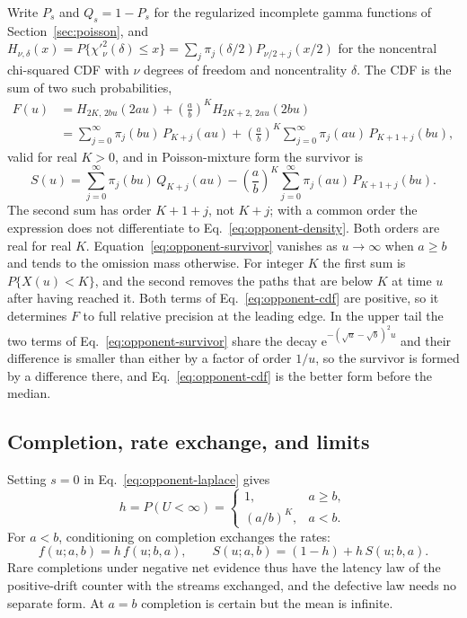 \documentclass[12pt]{article}
\newcommand{\e}{\mathrm{e}}
\theoremstyle{definition}
\theoremstyle{plain}
\theoremstyle{remark}
\begin{document}
Write $P_s$ and $Q_s=1-P_s$ for the regularized incomplete gamma functions of Section~\ref{sec:poisson}, and $H_{\nu,\delta}(x)=P\{\chi'^2_\nu(\delta)\leq x\}=\sum_j\pi_j(\delta/2)P_{\nu/2+j}(x/2)$ for the noncentral chi-squared CDF with $\nu$ degrees of freedom and noncentrality $\delta$. The CDF is the sum of two such probabilities,
\begin{equation}
\begin{split}
 F(u)&=H_{2K,\,2bu}(2au)+\left(\frac ab\right)^KH_{2K+2,\,2au}(2bu)\\
 &=\sum_{j=0}^\infty\pi_j(bu)\,P_{K+j}(au)
 +\left(\frac ab\right)^K\sum_{j=0}^\infty\pi_j(au)\,P_{K+1+j}(bu),
\end{split}\label{eq:opponent-cdf}
\end{equation}
valid for real $K>0$, and in Poisson-mixture form the survivor is
\begin{equation}
 S(u)=\sum_{j=0}^\infty\pi_j(bu)\,Q_{K+j}(au)
 -\left(\frac ab\right)^K\sum_{j=0}^\infty\pi_j(au)\,P_{K+1+j}(bu).\label{eq:opponent-survivor}
\end{equation}
The second sum has order $K+1+j$, not $K+j$; with a common order the expression does not differentiate to Eq.~\eqref{eq:opponent-density}. Both orders are real for real $K$. Equation~\eqref{eq:opponent-survivor} vanishes as $u\to\infty$ when $a\geq b$ and tends to the omission mass otherwise. For integer $K$ the first sum is $P\{X(u)<K\}$, and the second removes the paths that are below $K$ at time $u$ after having reached it. Both terms of Eq.~\eqref{eq:opponent-cdf} are positive, so it determines $F$ to full relative precision at the leading edge. In the upper tail the two terms of Eq.~\eqref{eq:opponent-survivor} share the decay $\e^{-(\sqrt a-\sqrt b)^2u}$ and their difference is smaller than either by a factor of order $1/u$, so the survivor is formed by a difference there, and Eq.~\eqref{eq:opponent-cdf} is the better form before the median.

\subsection{Completion, rate exchange, and limits}
Setting $s=0$ in Eq.~\eqref{eq:opponent-laplace} gives
\begin{equation}
 h=P(U<\infty)=\begin{cases}1,&a\geq b,\\(a/b)^K,&a<b.\end{cases}\label{eq:opponent-h}
\end{equation}
For $a<b$, conditioning on completion exchanges the rates:
\begin{equation}
 f(u;a,b)=h\,f(u;b,a),\qquad S(u;a,b)=(1-h)+h\,S(u;b,a).\label{eq:opponent-swap}
\end{equation}
Rare completions under negative net evidence thus have the latency law of the positive-drift counter with the streams exchanged, and the defective law needs no separate form. At $a=b$ completion is certain but the mean is infinite.
\end{document}
